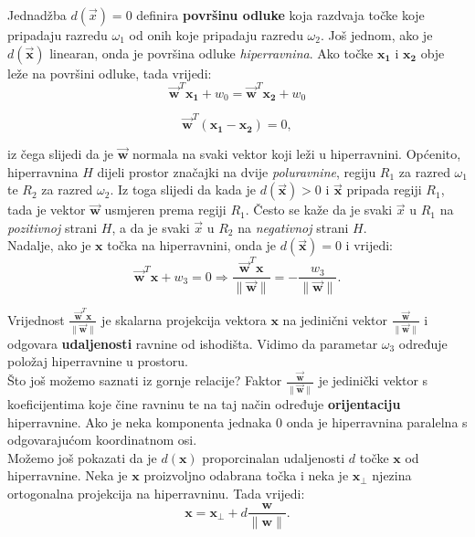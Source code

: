 \documentclass{book}
\begin{document}
Jednadžba
$d(\vec{x}) = 0$ definira \textbf{površinu odluke} koja razdvaja točke koje
pripadaju razredu $\omega_1$ od onih koje pripadaju razredu $\omega_2$. Još
jednom, ako je $d(\vec{\mathbf{x}})$ linearan, onda je površina odluke
\textit{hiperravnina}. Ako točke $\mathbf{x_1}$ i $\mathbf{x_2}$ obje leže na
površini odluke, tada vrijedi:
$$ \vec{\mathbf{w}}^T\mathbf{x_1} + w_0 = \vec{\mathbf{w}}^T\mathbf{x_2} + w_0
$$

$$ \vec{\mathbf{w}}^T( \mathbf{x_1} - \mathbf{x_2}) = 0, $$

iz čega slijedi da je $\vec{\mathbf{w}}$ normala na svaki vektor koji leži u
hiperravnini. Općenito, hiperravnina $H$ dijeli prostor značajki na dvije
\textit{poluravnine}, regiju $R_1$ za razred $\omega_1$ te $R_2$ za razred
$\omega_2$. Iz toga slijedi da kada je $d(\vec{\mathbf{x}})>0$ i
$\vec{\mathbf{x}}$ pripada regiji $R_1$, tada je  vektor $\vec{\mathbf{w}}$
usmjeren prema regiji $R_1$. Često se kaže da je  svaki $\vec{x}$ u $R_1$ na
\textit{pozitivnoj} strani $H$, a da je svaki  $\vec{x}$ u $R_2$ na
\textit{negativnoj} strani $H$. \\

Nadalje, ako je $\mathbf{x}$ točka na hiperravnini, onda je
$d(\vec{\mathbf{x}})=0$ i vrijedi:
$$ \vec{\mathbf{w}}^T\mathbf{x} + w_3 = 0 \Longrightarrow
\frac{\vec{\mathbf{w}}^T\mathbf{x}}{\lVert \vec{\mathbf{w}} \rVert} = -
\frac{w_3}{\lVert \vec{\mathbf{w}} \rVert} .$$

Vrijednost 
$\frac{\vec{\mathbf{w}}^T\mathbf{x}}{\lVert \vec{\mathbf{w}} \rVert}$ je  
skalarna projekcija vektora $\mathbf{x}$ na  jedinični  vektor
$\frac{\vec{\mathbf{w}}}{\lVert  \vec{\mathbf{w}} \rVert}$ i odgovara
\textbf{udaljenosti} ravnine  od  ishodišta. Vidimo da parametar $\omega_3$
određuje položaj hiperravnine u prostoru. \\

Što još možemo saznati iz gornje relacije?  Faktor 
$\frac{\vec{\mathbf{w}}}{\lVert \vec{\mathbf{w}} \rVert}$ je jedinički vektor s
koeficijentima koje čine ravninu te na taj način određuje \textbf{orijentaciju}
hiperravnine. Ako je neka komponenta jednaka 0 onda je hiperravnina paralelna s
odgovarajućom koordinatnom osi. \\

Možemo još pokazati da je $d(\mathbf{x})$ proporcinalan udaljenosti $d$ točke
$\mathbf{x}$ od hiperravnine. Neka je $\mathbf{x}$ proizvoljno odabrana točka i
neka je $\mathbf{x_{\perp}}$ njezina ortogonalna projekcija na hiperravninu.
Tada vrijedi:
$$ \mathbf{x} = \mathbf{x_{\perp}} + d\frac{\mathbf{w}}{\lVert \mathbf{w}
\rVert}. $$
\end{document}
